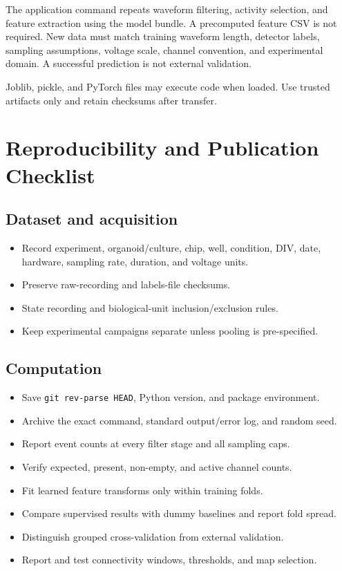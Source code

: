 \documentclass[11pt,a4paper]{article}
\newcommand{\code}[1]{\texttt{#1}}
\begin{document}
The application command repeats waveform filtering, activity selection, and
feature extraction using the model bundle. A precomputed feature CSV is not
required. New data must match training waveform length, detector labels,
sampling assumptions, voltage scale, channel convention, and experimental
domain. A successful prediction is not external validation.

Joblib, pickle, and PyTorch files may execute code when loaded. Use trusted
artifacts only and retain checksums after transfer.

\section{Reproducibility and Publication Checklist}

\subsection{Dataset and acquisition}

\begin{itemize}
  \item Record experiment, organoid/culture, chip, well, condition, DIV, date,
  hardware, sampling rate, duration, and voltage units.
  \item Preserve raw-recording and labels-file checksums.
  \item State recording and biological-unit inclusion/exclusion rules.
  \item Keep experimental campaigns separate unless pooling is pre-specified.
\end{itemize}

\subsection{Computation}

\begin{itemize}
  \item Save \code{git rev-parse HEAD}, Python version, and package environment.
  \item Archive the exact command, standard output/error log, and random seed.
  \item Report event counts at every filter stage and all sampling caps.
  \item Verify expected, present, non-empty, and active channel counts.
  \item Fit learned feature transforms only within training folds.
  \item Compare supervised results with dummy baselines and report fold spread.
  \item Distinguish grouped cross-validation from external validation.
  \item Report and test connectivity windows, thresholds, and map selection.
\end{itemize}
\end{document}

